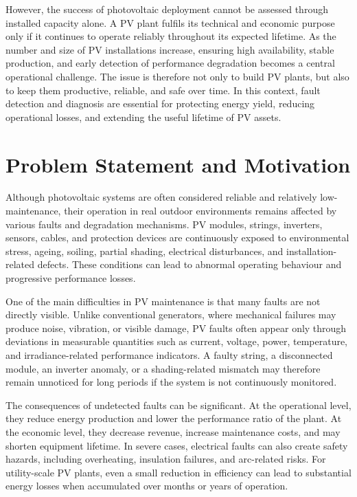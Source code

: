 However, the success of photovoltaic deployment cannot be assessed through installed capacity alone. A PV plant fulfils its technical and economic purpose only if it continues to operate reliably throughout its expected lifetime. As the number and size of PV installations increase, ensuring high availability, stable production, and early detection of performance degradation becomes a central operational challenge. The issue is therefore not only to build PV plants, but also to keep them productive, reliable, and safe over time. In this context, fault detection and diagnosis are essential for protecting energy yield, reducing operational losses, and extending the useful lifetime of PV assets.

\section*{Problem Statement and Motivation}

Although photovoltaic systems are often considered reliable and relatively low-maintenance, their operation in real outdoor environments remains affected by various faults and degradation mechanisms. PV modules, strings, inverters, sensors, cables, and protection devices are continuously exposed to environmental stress, ageing, soiling, partial shading, electrical disturbances, and installation-related defects. These conditions can lead to abnormal operating behaviour and progressive performance losses.

One of the main difficulties in PV maintenance is that many faults are not directly visible. Unlike conventional generators, where mechanical failures may produce noise, vibration, or visible damage, PV faults often appear only through deviations in measurable quantities such as current, voltage, power, temperature, and irradiance-related performance indicators. A faulty string, a disconnected module, an inverter anomaly, or a shading-related mismatch may therefore remain unnoticed for long periods if the system is not continuously monitored.

The consequences of undetected faults can be significant. At the operational level, they reduce energy production and lower the performance ratio of the plant. At the economic level, they decrease revenue, increase maintenance costs, and may shorten equipment lifetime. In severe cases, electrical faults can also create safety hazards, including overheating, insulation failures, and arc-related risks. For utility-scale PV plants, even a small reduction in efficiency can lead to substantial energy losses when accumulated over months or years of operation.


